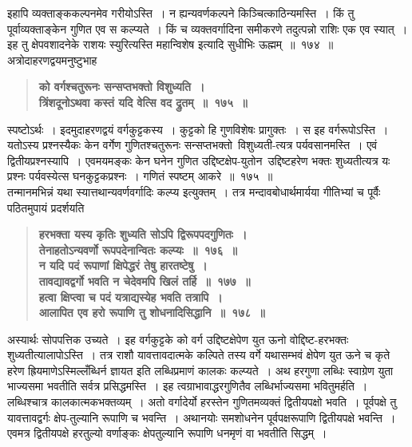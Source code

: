 \documentclass[11pt, openany]{book}
\begin{document}
\newpage

\begin{sloppypar}
\noindent इहापि व्यक्ताङ्ककल्पनमेव गरीयोऽस्ति~। न ह्यन्यवर्णकल्पने किञ्चित्काठिन्यमस्ति~। किं तु पूर्वाव्यक्ताङ्केन गुणित एव स कल्प्यते~। किं च व्यक्तवर्गादिना समीकरणे तदुत्पन्नो राशिः एक एव स्यात्~। इह तु क्षेपवशादनेके राशयः स्युरित्यस्ति महान्विशेष इत्यादि सुधीभिः ऊह्मम्~॥~१७४~॥\\

{\small अत्रोदाहरणद्वयमनुष्टुभाह\textendash }

 \label{10.175}
\begin{quote}
{\large \textbf{{\color{purple}को वर्गश्चतुरूनः सन्सप्तभक्तो विशुध्यति~।\\
त्रिंशदूनोऽथवा कस्तं यदि वेत्सि वद द्रुतम्~॥~१७५~॥}}}
\end{quote}

स्पष्टोऽर्थः~। इदमुदाहरणद्वयं वर्गकुट्टकस्य~। कुट्टको हि गुणविशेषः प्रागुक्तः~। स इह वर्गरूपोऽस्ति~। यतोऽस्य प्रश्नस्यैकः केन वर्गेण गुणितश्चतुरूनः सन्सप्तभक्तो~विशुध्यती-त्यत्र पर्यवसानमस्ति~। एवं द्वितीयप्रश्नस्यापि~। एवमयमङ्कः केन घनेन गुणित उद्दिष्टक्षेप-युतोन~उद्दिष्टहरेण भक्तः शुध्यतीत्यत्र यः प्रश्नः पर्यवस्येत्स घनकुट्टकप्रश्नः~। गणितं स्पष्टम् आकरे~॥~१७५~॥\\

{\small तन्मानमभिन्नं यथा स्यात्तथान्यवर्णवर्गादिः कल्प्य इत्युक्तम्~। तत्र मन्दावबोधार्थमार्यया गीतिभ्यां च पूर्वैः पठितमुपायं प्रदर्शयति\textendash }

 \label{10.176}
\begin{quote}
{\large \textbf{{\color{purple}हरभक्ता यस्य कृतिः शुध्यति सोऽपि द्विरूपपदगुणितः~।\\
तेनाहतोऽन्यवर्णो रूपपदेनान्वितः कल्प्यः~॥~१७६~॥\\
न यदि पदं रूपाणां क्षिपेद्धरं तेषु हारतष्टेषु~।\\ 
तावद्यावद्वर्गो भवति न चेदेवमपि खिलं तर्हि~॥~१७७~॥\\
हत्वा क्षिप्त्वा च पदं यत्राद्यस्येह भवति तत्रापि~।\\
आलापित एव हरो रूपाणि तु शोधनादिसिद्धानि~॥~१७८~॥}}}
\end{quote}

अस्यार्थः सोपपत्तिक उच्यते~। इह वर्गकुट्टके को वर्ग उद्दिष्टक्षेपेण युत ऊनो वोद्दिष्ट-हरभक्तः शुध्यतीत्यालापोऽस्ति~। तत्र राशौ यावत्तावदात्मके कल्पिते तस्य वर्गे यथासम्भवं क्षेपेण युत ऊने च कृते हरेण ह्रियमाणेऽस्मिल्लँब्धिर्न ज्ञायत इति लब्धिप्रमाणं कालकः कल्प्यते~। अथ हरगुणा लब्धिः स्वाग्रेण युता भाज्यसमा भवतीति सर्वत्र प्रसिद्धमस्ति~। इह त्वग्राभावाद्धरगुणितैव लब्धिर्भाज्यसमा भवितुमर्हति~। लब्धिश्चात्र कालकात्मकभक्तव्यम्~। अतो वर्गादेर्यो हरस्तेन गुणितमव्यक्तं द्वितीयपक्षो भवति~। पूर्वपक्षे तु यावत्तावद्वर्गः क्षेप-तुल्यानि रूपाणि च भवन्ति~। अथानयोः समशोधनेन पूर्वपक्षरूपाणि द्वितीयपक्षे भवन्ति~। एवमत्र द्वितीयपक्षे हरतुल्यो वर्णाङ्कः क्षेपतुल्यानि रूपाणि धनमृणं वा भवतीति सिद्धम्~।
\end{sloppypar}
\end{document}
